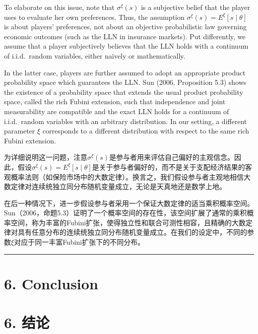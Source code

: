 \documentclass[12pt,a4paper]{article}
\newenvironment{original}
  {\par\medskip\noindent\color{black}\ignorespaces}
  {\par\medskip}
\newenvironment{translation}
  {\par\noindent\color{darkblue}\ignorespaces}
  {\par\medskip\noindent\hrule\par\medskip}
\theoremstyle{definition}
\theoremstyle{remark}
\begin{document}
\begin{original}
To elaborate on this issue, note that $\sigma^\xi(s)$ is a subjective belief that the player uses to evaluate her own preferences. Thus, the assumption $\sigma^\xi(s) = E^\xi[s \mid \theta]$ is about players' preferences, not about an objective probabilistic law governing economic outcomes (such as the LLN in insurance markets). Put differently, we assume that a player subjectively believes that the LLN holds with a continuum of i.i.d.\ random variables, either na\"ively or mathematically.

In the latter case, players are further assumed to adopt an appropriate product probability space which guarantees the LLN. Sun (2006, Proposition 5.3) shows the existence of a probability space that extends the usual product probability space, called the rich Fubini extension, such that independence and joint measurability are compatible and the exact LLN holds for a continuum of i.i.d.\ random variables with an arbitrary distribution. In our setting, a different parameter $\xi$ corresponds to a different distribution with respect to the same rich Fubini extension.
\end{original}
\begin{translation}
为详细说明这一问题，注意$\sigma^\xi(s)$是参与者用来评估自己偏好的主观信念。因此，假设$\sigma^\xi(s) = E^\xi[s \mid \theta]$是关于参与者偏好的，而不是关于支配经济结果的客观概率法则（如保险市场中的大数定律）。换言之，我们假设参与者主观地相信大数定律对连续统独立同分布随机变量成立，无论是天真地还是数学上地。

在后一种情况下，进一步假设参与者采用一个保证大数定律的适当乘积概率空间。Sun（2006，命题5.3）证明了一个概率空间的存在性，该空间扩展了通常的乘积概率空间，称为丰富的Fubini扩张，使得独立性和联合可测性相容，且精确的大数定律对具有任意分布的连续统独立同分布随机变量成立。在我们的设定中，不同的参数$\xi$对应于同一丰富Fubini扩张下的不同分布。
\end{translation}
\section{6. Conclusion}
\section*{\color{darkblue}6. 结论}
\end{document}
